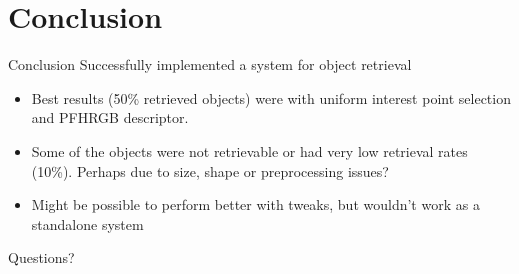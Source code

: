 \documentclass{beamer}
\begin{document}
\section{Conclusion}
\begin{frame}{Conclusion}
  Successfully implemented a system for object retrieval
  \begin{itemize}
  \item Best results (50\% retrieved objects) were with uniform interest point
    selection and PFHRGB descriptor.
  \item Some of the objects were not retrievable or had very low retrieval rates
    (10\%). Perhaps due to size, shape or preprocessing issues?
  \item Might be possible to perform better with tweaks, but wouldn't work as a standalone system
  \end{itemize}
\end{frame}
\begin{frame}
  \begin{center}
    \huge Questions?
  \end{center}
\end{frame}
\end{document}
